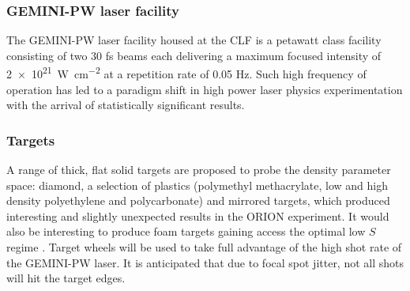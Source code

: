 \subsubsection{GEMINI-PW laser facility}
The GEMINI-PW laser facility housed at the \ac{CLF} is a petawatt class facility consisting of two 30 fs beams each delivering a maximum focused intensity of \qty{2e21}{W.cm^{-2}} at a repetition rate of 0.05 Hz. Such high frequency of operation has led to a paradigm shift in high power laser physics experimentation with the arrival of statistically significant results.


\subsubsection{Targets}
A range of thick, flat solid targets are proposed to probe the density parameter space: diamond, a selection of plastics (polymethyl methacrylate, low and high density polyethylene and polycarbonate) and mirrored targets, which produced interesting and slightly unexpected results in the ORION experiment. It would also be interesting to produce foam targets gaining access the optimal low $S$ regime \cite{bataniPhysicsIssuesShock2014}. Target wheels will be used to take full advantage of the high shot rate of the GEMINI-PW laser. It is anticipated that due to focal spot jitter, not all shots will hit the target edges. 

